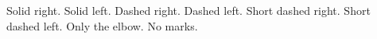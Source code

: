\documentclass[paper={a5paper},maintitle={Chapter Mark Test}]{ulsbs-songbook}
\begin{document}
\ulChapterCornerMarkWidth=4bp
\ulChapterCornerMarkLength=17bp
\makeatletter{}\makeatother
Solid right.\newpage
\makeatletter\def\ulsbs@currentchaptercolor{blue}\makeatother
Solid left.\newpage
Dashed right.\newpage
Dashed left.\newpage
\ulChapterCornerMarkLength=5bp
Short dashed right.\newpage
{}
Short dashed left.\newpage
\ulChapterCornerMarkLength=1bp
Only the elbow.\newpage
{}
No marks.
\end{document}
